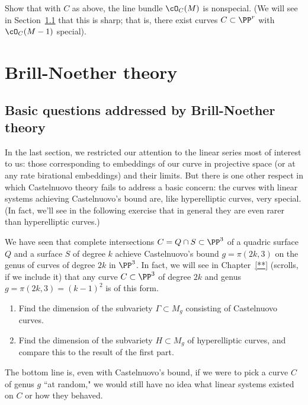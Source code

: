 \begin{exercise}
Show that with $C$ as above, the line bundle $\cO_C(M)$ is nonspecial. (We will see in Section~\ref{} that this is sharp; that is, there exist curves $C \subset \PP^r$ with $\cO_C(M-1)$ special).
\end{exercise}


\section{Brill-Noether theory}

\subsection{Basic questions addressed by Brill-Noether theory}

In the last section, we restricted our attention to the linear series most of interest to us: those corresponding to embeddings of our curve in projective space (or at any rate birational embeddings) and their limits. But there is one other respect in which Castelnuovo theory fails to address a basic concern: the curves with linear systems achieving Castelnuovo's bound are, like hyperelliptic curves, very special. (In fact, we'll see in the following exercise that in general they are even rarer than hyperelliptic curves.) 

\begin{exercise}
We have seen that complete intersections $C = Q \cap S \subset \PP^3$ of a quadric surface $Q$ and a surface $S$ of degree $k$ achieve Castelnuovo's bound $g = \pi(2k, 3)$ on the genus of curves of degree $2k$ in $\PP^3$. In fact, we will see in Chapter~\ref{**} (scrolls, if we include it) that any curve $C \subset \PP^3$ of degree $2k$ and genus $g = \pi(2k, 3) = (k-1)^2$ is of this form.
\begin{enumerate}
\item Find the dimension of the subvariety $\Gamma \subset M_g$ consisting of Castelnuovo curves.
\item Find the dimension of the subvariety $H \subset M_g$ of hyperelliptic curves, and compare this to the result of the first part.
\end{enumerate}
\end{exercise}

The bottom line is, even with Castelnuovo's bound, if we were to pick a curve $C$ of genus $g$ ``at random," we would still have no idea what linear systems existed on $C$ or how they behaved.

